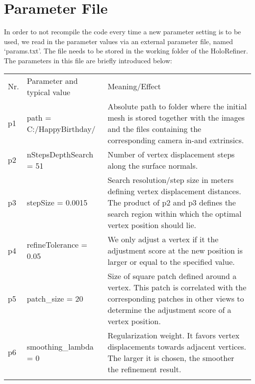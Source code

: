 \documentclass[10pt,a4paper]{article}
\begin{document}
\section{Parameter File}
In order to not recompile the code every time a new parameter setting is to be used, we read in the parameter values via an external parameter file, named ‘params.txt’. The file needs to be stored in the working folder of the HoloRefiner. The parameters in this file are briefly introduced below:

\begin{longtable}{p{0.5cm}p{4.5cm}p{8.5cm}}

Nr. & Parameter and typical value & Meaning/Effect \\ \noalign{\smallskip}\hline 
\endhead
\endfoot
\noalign{\smallskip}

p1 & path = C:/HappyBirthday/ & Absolute path to folder where the initial mesh is stored together with the images and the files containing the corresponding camera in-and extrinsics.\\ \noalign{\smallskip} \hline \noalign{\smallskip}

p2 & nStepsDepthSearch = 51 & Number of vertex displacement steps along the surface normals.\\ \noalign{\smallskip} \hline \noalign{\smallskip}

p3 & stepSize = 0.0015 & Search resolution/step size in meters defining vertex displacement distances. The product of p2 and p3 defines the search region within which the optimal vertex position should lie.\\ \noalign{\smallskip} \hline \noalign{\smallskip}

p4 & refineTolerance = 0.05 & We only adjust a vertex if it the adjustment score at the new position is larger or equal to the specified value.\\ \noalign{\smallskip} \hline \noalign{\smallskip}

p5 & patch\_size = 20 & Size of square patch defined around a vertex. This patch is correlated with the corresponding patches in other views to determine the adjustment score of a vertex position.\\ \noalign{\smallskip} \hline \noalign{\smallskip}

p6 & smoothing\_lambda = 0 & Regularization weight. It favors vertex displacements towards adjacent vertices. The larger it is chosen, the smoother the refinement result.\\ \noalign{\smallskip} \hline \noalign{\smallskip}


\end{longtable}
\end{document}
